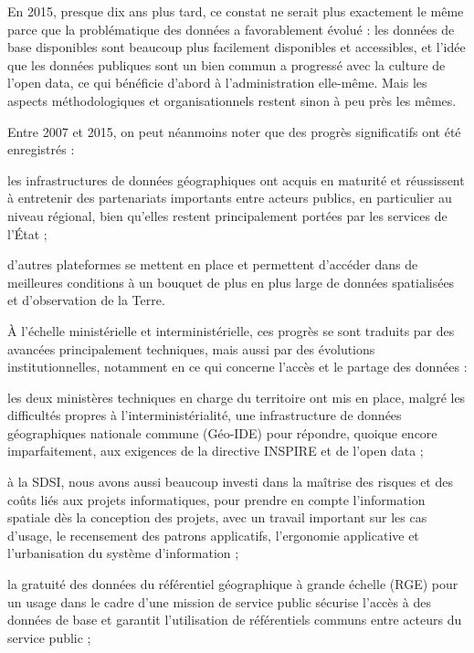\stopitemize

En 2015, presque dix ans plus tard, ce constat ne serait plus exactement le
même parce que la problématique des données a favorablement évolué : les
données de base disponibles sont beaucoup plus facilement disponibles et
accessibles, et l'idée que les données publiques sont un bien commun a
progressé avec la culture de l'open data, ce qui bénéficie d'abord à
l'administration elle-même. Mais les aspects méthodologiques et
organisationnels restent sinon à peu près les mêmes.

Entre 2007 et 2015, on peut néanmoins noter que des progrès significatifs ont
été enregistrés :

\startitemize

\item les infrastructures de données géographiques ont acquis en maturité et
réussissent à entretenir des partenariats importants entre acteurs publics, en
particulier au niveau régional, bien qu'elles restent principalement portées
par les services de l'État ;

\item d'autres plateformes se mettent en place et permettent d'accéder dans de
meilleures conditions à un bouquet de plus en plus large de données
spatialisées et d'observation de la Terre.

\stopitemize

À l'échelle ministérielle et interministérielle, ces progrès se sont traduits
par des avancées principalement techniques, mais aussi par des évolutions
institutionnelles, notamment en ce qui concerne l'accès et le partage des
données :

\startitemize

\item les deux ministères techniques en charge du territoire ont mis en place,
malgré les difficultés propres à l’interministérialité, une infrastructure de
données géographiques nationale commune (Géo-IDE) pour répondre, quoique
encore imparfaitement, aux exigences de la directive INSPIRE et de l'open data
;

\item à la SDSI, nous avons aussi beaucoup investi dans la maîtrise des risques et
des coûts liés aux projets informatiques, pour prendre en compte l'information
spatiale dès la conception des projets, avec un travail important sur les cas
d'usage, le recensement des patrons applicatifs, l'ergonomie applicative et
l'urbanisation du système d'information ;

\item la gratuité des données du référentiel géographique à grande échelle (RGE)
pour un usage dans le cadre d'une mission de service public sécurise l'accès à
des données de base et garantit l'utilisation de référentiels communs entre
acteurs du service public ;

